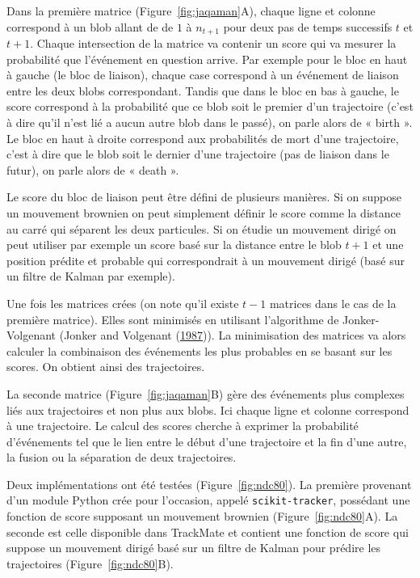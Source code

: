 \documentclass[12pt,a4paper,twoside,openright]{book}
\begin{document}
Dans la première matrice (Figure~\ref{fig:jaqaman}A), chaque ligne et
colonne correspond à un blob allant de de \(1\) à \(n_{t+1}\) pour deux
pas de temps successifs \(t\) et \(t+1\). Chaque intersection de la
matrice va contenir un score qui va mesurer la probabilité que
l'événement en question arrive. Par exemple pour le bloc en haut à
gauche (le bloc de liaison), chaque case correspond à un événement de
liaison entre les deux blobs correspondant. Tandis que dans le bloc en
bas à gauche, le score correspond à la probabilité que ce blob soit le
premier d'un trajectoire (c'est à dire qu'il n'est lié a aucun autre
blob dans le passé), on parle alors de « birth ». Le bloc en haut à
droite correspond aux probabilités de mort d'une trajectoire, c'est à
dire que le blob soit le dernier d'une trajectoire (pas de liaison dans
le futur), on parle alors de « death ».

Le score du bloc de liaison peut être défini de plusieurs manières. Si
on suppose un mouvement brownien on peut simplement définir le score
comme la distance au carré qui séparent les deux particules. Si on
étudie un mouvement dirigé on peut utiliser par exemple un score basé
sur la distance entre le blob \(t+1\) et une position prédite et
probable qui correspondrait à un mouvement dirigé (basé sur un filtre de
Kalman par exemple).

Une fois les matrices crées (on note qu'il existe \(t-1\) matrices dans
le cas de la première matrice). Elles sont minimisés en utilisant
l'algorithme de Jonker-Volgenant (Jonker and Volgenant
(\hyperref[ref-Jonker1987]{1987})). La minimisation des matrices va
alors calculer la combinaison des événements les plus probables en se
basant sur les scores. On obtient ainsi des trajectoires.

La seconde matrice (Figure~\ref{fig:jaqaman}B) gère des événements plus
complexes liés aux trajectoires et non plus aux blobs. Ici chaque ligne
et colonne correspond à une trajectoire. Le calcul des scores cherche à
exprimer la probabilité d'événements tel que le lien entre le début
d'une trajectoire et la fin d'une autre, la fusion ou la séparation de
deux trajectoires.

Deux implémentations ont été testées (Figure~\ref{fig:ndc80}). La
première provenant d'un module Python crée pour l'occasion, appelé
\texttt{scikit-tracker}, possédant une fonction de score supposant un
mouvement brownien (Figure~\ref{fig:ndc80}A). La seconde est celle
disponible dans TrackMate et contient une fonction de score qui suppose
un mouvement dirigé basé sur un filtre de Kalman pour prédire les
trajectoires (Figure~\ref{fig:ndc80}B).
\end{document}
